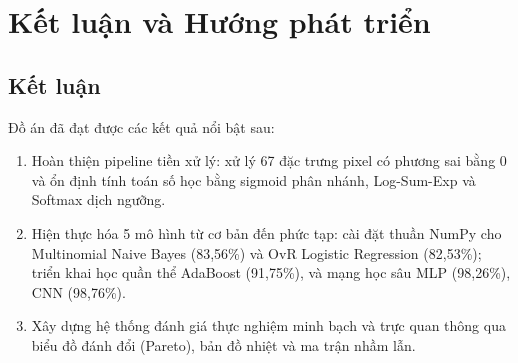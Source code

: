 \documentclass[11pt,a4paper]{article}
\begin{document}
\section{Kết luận và Hướng phát triển}

\subsection{Kết luận}
Đồ án đã đạt được các kết quả nổi bật sau:
\begin{enumerate}
    \item Hoàn thiện pipeline tiền xử lý: xử lý 67 đặc trưng pixel có phương sai bằng 0 và ổn định tính toán số học bằng sigmoid phân nhánh, Log-Sum-Exp và Softmax dịch ngưỡng.
    \item Hiện thực hóa 5 mô hình từ cơ bản đến phức tạp: cài đặt thuần NumPy cho Multinomial Naive Bayes (83,56\%) và OvR Logistic Regression (82,53\%); triển khai học quần thể AdaBoost (91,75\%), và mạng học sâu MLP (98,26\%), CNN (98,76\%).
    \item Xây dựng hệ thống đánh giá thực nghiệm minh bạch và trực quan thông qua biểu đồ đánh đổi (Pareto), bản đồ nhiệt và ma trận nhầm lẫn.
\end{enumerate}
\end{document}
